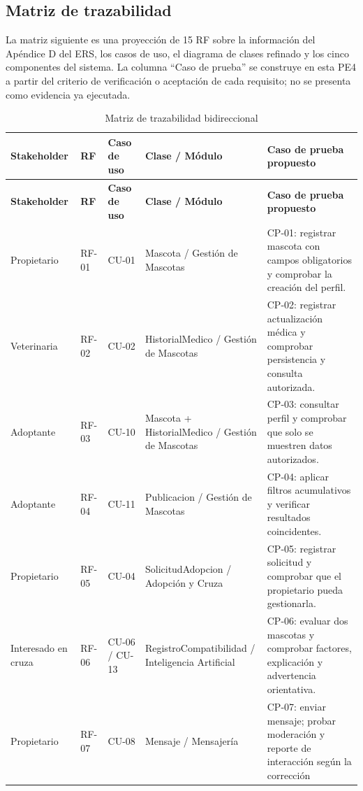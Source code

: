 \documentclass[journal,onecolumn]{IEEEtran}
\begin{document}
	\subsection{Matriz de trazabilidad}
	
	La matriz siguiente es una proyección de 15 RF sobre la información del Apéndice D del ERS, los
	casos de uso, el diagrama de clases refinado y los cinco componentes del sistema. La columna
	``Caso de prueba'' se construye en esta PE4 a partir del criterio de verificación o aceptación de
	cada requisito; no se presenta como evidencia ya ejecutada.
	
	\begin{longtable}{L{2.6cm} L{1.2cm} L{2.0cm} L{3.6cm} L{4.1cm}}
		\caption{Matriz de trazabilidad bidireccional}\label{tab:matriz}\\
		\toprule
		\textbf{Stakeholder} & \textbf{RF} & \textbf{Caso de uso} & \textbf{Clase / Módulo} &
		\textbf{Caso de prueba propuesto} \\
		\midrule
		\endfirsthead
		\toprule
		\textbf{Stakeholder} & \textbf{RF} & \textbf{Caso de uso} & \textbf{Clase / Módulo} &
		\textbf{Caso de prueba propuesto} \\
		\midrule
		\endhead
		\bottomrule
		\endfoot
		Propietario & RF-01 & CU-01 & Mascota / Gestión de Mascotas &
		CP-01: registrar mascota con campos obligatorios y comprobar la creación del perfil. \\
		Veterinaria & RF-02 & CU-02 & HistorialMedico / Gestión de Mascotas &
		CP-02: registrar actualización médica y comprobar persistencia y consulta autorizada. \\
		Adoptante & RF-03 & CU-10 & Mascota + HistorialMedico / Gestión de Mascotas &
		CP-03: consultar perfil y comprobar que solo se muestren datos autorizados. \\
		Adoptante & RF-04 & CU-11 & Publicacion / Gestión de Mascotas &
		CP-04: aplicar filtros acumulativos y verificar resultados coincidentes. \\
		Propietario & RF-05 & CU-04 & SolicitudAdopcion / Adopción y Cruza &
		CP-05: registrar solicitud y comprobar que el propietario pueda gestionarla. \\
		Interesado en cruza & RF-06 & CU-06 / CU-13 & RegistroCompatibilidad / Inteligencia
		Artificial &
		CP-06: evaluar dos mascotas y comprobar factores, explicación y advertencia orientativa. \\
		Propietario & RF-07 & CU-08 & Mensaje / Mensajería &
		CP-07: enviar mensaje; probar moderación y reporte de interacción según la corrección

\end{longtable}
\end{document}
